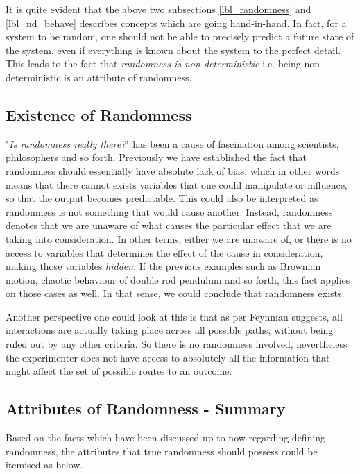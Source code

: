 It is quite evident that the above two subsections \ref{lbl_randomness} and \ref{lbl_nd_behave} describes concepts which are going hand-in-hand. In fact, for a system to be random, one should not be able to precisely predict a future state of the system, even if everything is known about the system to the perfect detail. This leads to the fact that \textit{randomness is non-deterministic} i.e. being non-deterministic is an attribute of randomness.

\subsection{Existence of Randomness}

"\textit{Is randomness really there?}" has been a cause of fascination among scientists, philosophers and so forth. Previously we have established the fact that randomness should essentially have absolute lack of bias, which in other words means that there cannot exists variables that one could manipulate or influence, so that the output becomes predictable. This could also be interpreted as randomness is not something that would cause another. Instead, randomness denotes that we are unaware of what causes the particular effect that we are taking into consideration. In other terms, either we are unaware of, or there is no access to variables that determines the effect of the cause in consideration, making those variables \textit{hidden}. If the previous examples such as Brownian motion, chaotic behaviour of double rod pendulum and so forth, this fact applies on those cases as well. In that sense, we could conclude that randomness exists.

Another perspective one could look at this is that as per Feynman suggests, all interactions are actually taking place across all possible paths, without being ruled out by any other criteria. So there is no randomness involved, nevertheless the experimenter does not have access to absolutely all the information that might affect the set of possible routes to an outcome.

\subsection{Attributes of Randomness - Summary}\label{subsec:rand_attr_sum}

Based on the facts which have been discussed up to now regarding defining randomness, the attributes that true randomness should possess could be itemised as below.

